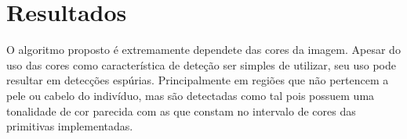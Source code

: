 \documentclass[journal,onecolumn]{IEEEtran}
\begin{document}
	\section{Resultados}
	\label{sec:resultados}
	O algoritmo proposto é extremamente dependete das cores da imagem. 
	Apesar do uso das cores como característica de deteção ser simples de utilizar, seu uso pode resultar  em detecções espúrias.
	Principalmente em regiões que não pertencem a pele ou cabelo do indivíduo, mas são detectadas como tal pois possuem uma tonalidade de cor parecida com as que constam no intervalo de cores das primitivas implementadas.
\begin{figure}[htb]
\end{figure}
\end{document}
